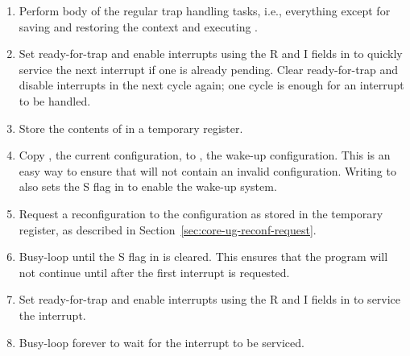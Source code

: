 \begin{enumerate}

\item Perform body of the regular trap handling tasks, i.e., everything except 
for saving and restoring the context and executing .

\item Set ready-for-trap and enable interrupts using the R and I fields in 
 to quickly service the next interrupt if one is already pending.
Clear ready-for-trap and disable interrupts in the next cycle again; one cycle
is enough for an interrupt to be handled.

\item Store the contents of  in a temporary register.

\item Copy , the current configuration, to , the wake-up
configuration. This is an easy way to ensure that  will not contain
an invalid configuration. Writing to  also sets the S flag in
 to enable the wake-up system.

\item Request a reconfiguration to the configuration as stored in the temporary
register, as described in Section~\ref{sec:core-ug-reconf-request}.

\item Busy-loop until the S flag in  is cleared. This ensures that
the program will not continue until after the first interrupt is requested.

\item Set ready-for-trap and enable interrupts using the R and I fields in 
 to service the interrupt.

\item Busy-loop forever to wait for the interrupt to be serviced.

\end{enumerate}

